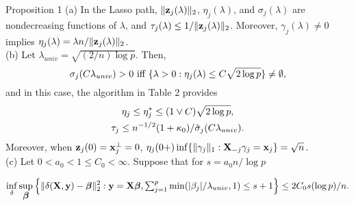 \begin{frame}
  \begin{block}{Proposition 1}
  \scriptsize
  (a) In the Lasso path, $\|\mbox{\bf z}_j(\lambda)\|_2$, $\eta_j(\lambda)$, and $\sigma_j(\lambda)$
  are nondecreasing functions of $\lambda$, and $\tau_j(\lambda)\le 1/\|\mbox{\bf z}_j(\lambda)\|_2$. Moreover,
  $\gamma_j(\lambda)\neq 0$ implies $\eta_j(\lambda)=\lambda n/\|\mbox{\bf z}_j(\lambda)\|_2$. \\
  
  (b) Let $\lambda_{univ}=\sqrt{(2/n)\log p}$. Then,
  \begin{equation}
  \setlength{\abovedisplayskip}{3pt} %
  \setlength{\belowdisplayskip}{3pt}
  \sigma_j(C\lambda_{univ})>0 \hbox{ iff } \{\lambda>0: \eta_j(\lambda) \le C\sqrt{2\log p}\}\neq \emptyset,
  \end{equation}
      and in this case, the algorithm in Table 2 provides
  \begin{gather}
  \setlength{\abovedisplayskip}{3pt} %
  \setlength{\belowdisplayskip}{3pt}
  \eta_{j}\leq \eta_j^*\le (1\vee C)\sqrt{2\log p},\\
  \tau_j\le n^{-1/2}(1+\kappa_0)/\hat{\sigma}_j(C\lambda_{univ}).
  \end{gather}
      Moreover, when $\mbox{\bf z}_j(0)=\mbox{\bf x}_j^\perp =0$, $\eta_j(0+) \inf\{\|\gamma_j\|_1: \mbox{\bf X}_{-j}\gamma_j=\mbox{\bf x}_j\}=\sqrt{n}$.\\
  (c) Let $0<a_0<1\leq C_0<\infty$. Suppose that for $s=a_0n/\log p$
  \begin{scriptsize}
      \begin{equation*}
      \setlength{\abovedisplayskip}{3pt} %
      \setlength{\belowdisplayskip}{3pt}
      \inf_{\delta}\sup_{\bbeta}\Big\{\|\delta(\bX,\by) - \bbeta\|_2^2: \by=\bX\bbeta,
      \hbox{$\sum_{j=1}^p$} \min(|\beta_j|/\lambda_{univ},1)\le s+1 \Big\}\le 2C_0s(\log p)/n.
      \end{equation*}
  \end{scriptsize}
  
  \end{block}
\end{frame}

